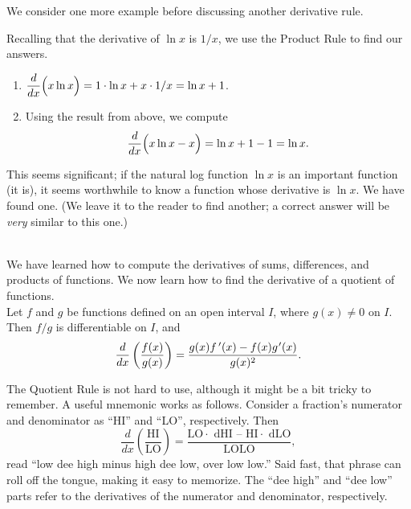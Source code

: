 We consider one more example before discussing another derivative rule.\\

{Recalling that the derivative of $\ln x$ is $1/x$, we use the Product Rule to find our answers.
		\begin{enumerate}
		\item	$\displaystyle \frac{d}{dx}\Big(x\ln x\Big) = 1\cdot \ln x + x\cdot 1/x = \ln x + 1$. 
		\item Using the result from above, we compute $$\displaystyle \frac{d}{dx}\Big(x\ln x-x\Big) = \ln x + 1 -1 = \ln x.$$ 
		\end{enumerate}
This seems significant; if the natural log function $\ln x$ is an important function (it is), it seems worthwhile to know a function whose derivative is $\ln x$. We have found one. (We leave it to the reader to find another; a correct answer will be \textit{very} similar to this one.)
}\\

We have learned how to compute the derivatives of sums, differences, and products of functions. We now learn how to find the derivative of a quotient of functions.\\

{Let $f$ and $g$ be functions defined on an open interval $I$, where $g(x) \neq 0$ on $I$. Then $f/g$ is differentiable on $I$, and $$\frac{d}{dx}\left(\frac{f(x)}{g(x)}\right) = \frac{g(x)f\,'(x) - f(x)g\hskip.75pt'(x)}{g(x)^2}.$$
}

The Quotient Rule is not hard to use, although it might be a bit tricky to remember. A useful mnemonic works as follows. Consider a fraction's numerator and denominator as ``HI'' and ``LO'', respectively. Then $$\frac{d}{dx}\left(\frac{\text{HI}}{\text{LO}}\right) = \frac{\text{LO$\cdot$ dHI -- HI$\cdot$ dLO}}{\text{LOLO}},$$ read ``low dee high minus high dee low, over low low.'' Said fast, that phrase can roll off the tongue, making it easy to memorize. The ``dee high'' and ``dee low'' parts refer to the derivatives of the numerator and denominator, respectively.\\

